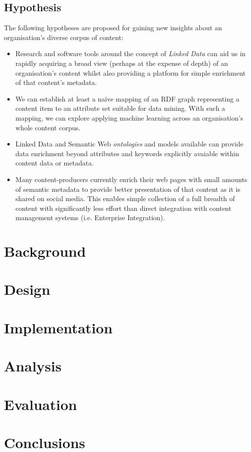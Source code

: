 \documentclass{sig-alternate-05-2015}
\begin{document}
\subsection{Hypothesis}

The following hypotheses are proposed for gaining new insights about an
organisation's diverse corpus of content:

\begin{itemize}

\item Research and software tools around the concept of \emph{Linked Data} can
aid us in rapidly acquiring a broad view (perhaps at the expense of depth) of an
organisation's content whilst also providing a platform for simple enrichment of
that content's metadata.

\item We can establish at least a na\"ive mapping of an RDF graph representing a
content item to an attribute set suitable for data mining. With such a mapping,
we can explore applying machine learning across an organisation's whole content
corpus.

\item Linked Data and Semantic Web \emph{ontologies} and models available can
provide data enrichment beyond attributes and keywords explicitly avaiable
within content data or metadata.

\item Many content-producers currently enrich their web pages with small
amounts of semantic metadata to provide better presentation of that content
as it is shared on social media. This enables simple collection of a full
breadth of content with significantly less effort than direct integration
with content management systems (i.e. Enterprise Integration).

\end{itemize}

\section{Background}

\section{Design}

\section{Implementation}

\section{Analysis}

\section{Evaluation}

\section{Conclusions}

%
%
\end{document}
